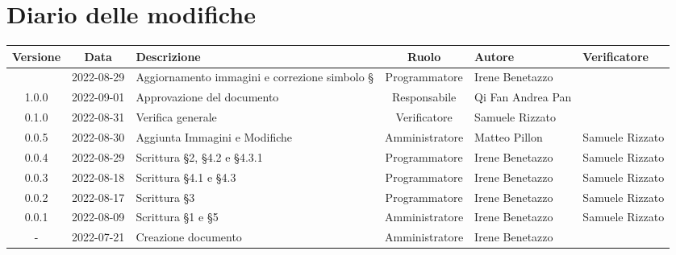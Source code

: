 \section*{Diario delle modifiche}
	\begin{center}
	\renewcommand{\arraystretch}{1.8} %
	\begin{longtable}{ |c|c|p{8em}|c|m{5em}|m{6em}| }
	\hline
	\textbf{Versione} & \textbf{Data} & \textbf{Descrizione} &  \textbf{Ruolo} &  \textbf{Autore} & \textbf{Verificatore}\\ %
	\hline %
	& 2022-08-29 & Aggiornamento immagini e correzione simbolo § & Programmatore & Irene \newline Benetazzo & \\ 
	\hline
	1.0.0& 2022-09-01 & Approvazione del documento & Responsabile & Qi Fan Andrea \newline Pan & \\ 	
	\hline
	0.1.0& 2022-08-31 & Verifica generale & Verificatore & Samuele \newline Rizzato & \\ 
	\hline
	0.0.5& 2022-08-30 & Aggiunta Immagini e Modifiche & Amministratore & Matteo \newline Pillon & Samuele \newline Rizzato\\ 
	\hline
	0.0.4& 2022-08-29 & Scrittura §2, §4.2 e §4.3.1 & Programmatore & Irene \newline Benetazzo & Samuele \newline Rizzato\\ 
	\hline
	0.0.3& 2022-08-18 & Scrittura §4.1 e §4.3 & Programmatore & Irene \newline Benetazzo & Samuele \newline Rizzato\\ 
	\hline
	0.0.2& 2022-08-17 & Scrittura §3 & Programmatore & Irene \newline Benetazzo & Samuele \newline Rizzato\\ 
	\hline
	0.0.1& 2022-08-09 & Scrittura §1 e §5 & Amministratore & Irene \newline Benetazzo & Samuele \newline Rizzato\\ 
	\hline
    -& 2022-07-21 & Creazione documento & Amministratore & Irene \newline Benetazzo & \\ 
	\hline
	\end{longtable}
	\end{center}
	\newpage